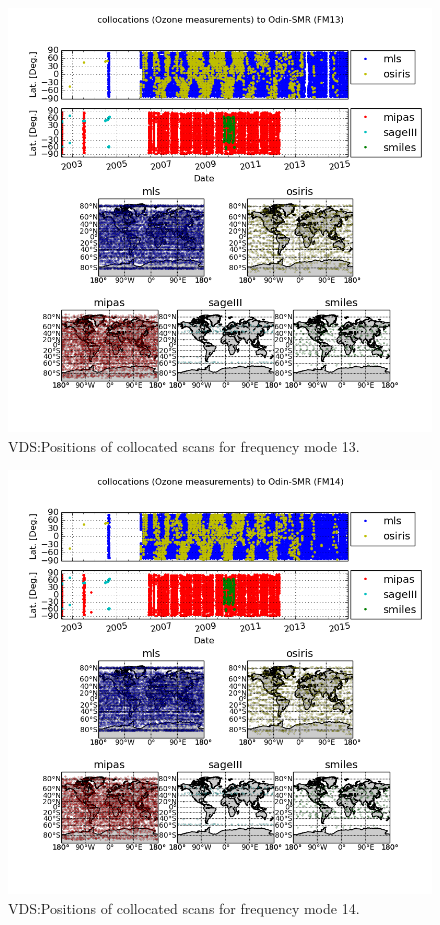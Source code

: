 \begin{figure}[t]
\centering
\includegraphics[width=17cm]{test_collocation_fm13.png}
\caption{VDS:Positions of collocated scans for frequency mode 13.}
\label{fig:vdsfm13}
\end{figure}


\begin{figure}[t]
\centering
\includegraphics[width=17cm]{test_collocation_fm14.png}
\caption{VDS:Positions of collocated scans for frequency mode 14.}
\label{fig:vdsfm14}
\end{figure}



